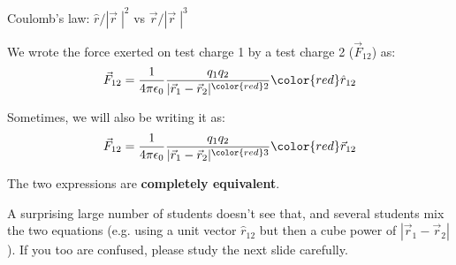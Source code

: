 %
%
%

\begin{frame}{Coulomb's law: $\hat{r}/|\vec{r}\;|^2$ vs $\vec{r}/|\vec{r}\;|^3$}

We wrote the force exerted on test charge 1 by a test charge 2 ($\vec{F}_{12}$) as:\\
{\Large
\begin{equation*}
   \vec{F}_{12} =
      \frac{1}{4\pi\epsilon_0}
      \frac{q_1 q_2}{|\vec{r}_{1}-\vec{r}_{2}|^{\color{red}2}}
      {\color{red} \hat{r}_{12} }
\end{equation*}
}
\vspace{0.2cm}

Sometimes, we will also be writing it as:\\
{\Large
\begin{equation*}
   \vec{F}_{12} =
      \frac{1}{4\pi\epsilon_0}
      \frac{q_1 q_2}{|\vec{r}_{1}-\vec{r}_{2}|^{\color{red}3}}
      {\color{red} \vec{r}_{12} }
\end{equation*}
}
\vspace{0.2cm}

The two expressions are {\bf completely equivalent}.\\
\vspace{0.2cm}

{\small
A surprising large number of students doesn't see that, and several students mix the two equations
(e.g. using a unit vector $\hat{r}_{12}$ but then a cube power of $|\vec{r}_{1}-\vec{r}_{2}|$).
If you too are confused, please study the next slide carefully.
}

\end{frame}

%
%
%

